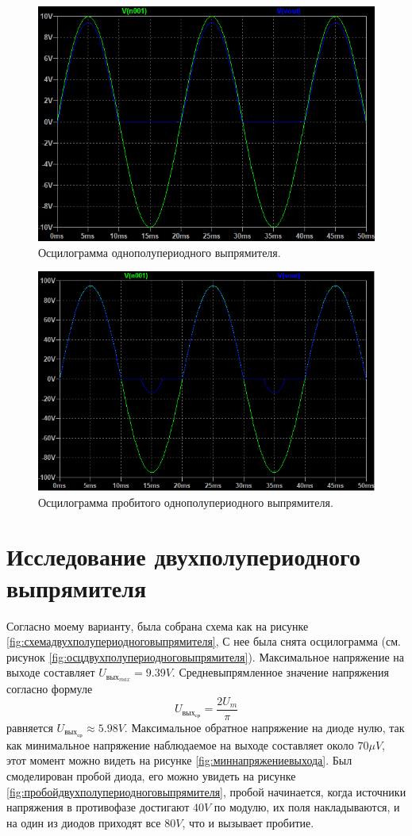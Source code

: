 \begin{figure}[htbp]
    \centering
    \includegraphics[width=0.8\linewidth]{figs/осцилограмма_выпрямителя.png}
    \caption{Осцилограмма однополупериодного выпрямителя.}
    \label{fig:осцилограмма}
\end{figure}

\begin{figure}[htbp]
    \centering
    \includegraphics[width=0.8\linewidth]{figs/осцилограмма_пробитого_выпрямителя.png}
    \caption{Осцилограмма пробитого однополупериодного выпрямителя.}
    \label{fig:осцилограммапробитая}
\end{figure}


\section*{Исследование двухполупериодного выпрямителя}

Согласно моему варианту, была собрана схема как на рисунке \ref{fig:схемадвухполупериодноговыпрямителя},
С нее была снята осцилограмма (см. рисунок \ref{fig:осцдвухполупериодноговыпрямителя}).
Максимальное напряжение на выходе составляет $U_{\text{вых}_{max}}=9.39V$. Средневыпрямленное
значение напряжения согласно формуле
$$
U_{\text{вых}_{\text{ср}}}=\frac{2U_m}{\pi}
$$
равняется $U_{\text{вых}_{\text{ср}}}\approx 5.98V$. Максимальное обратное напряжение на диоде
нулю, так как минимальное напряжение наблюдаемое на выходе составляет около $70\mu V$, этот момент
можно видеть на рисунке \ref{fig:миннапряжениевыхода}. Был смоделирован пробой диода, его
можно увидеть на рисунке \ref{fig:пробойдвухполупериодноговыпрямителя}, пробой начинается, когда
источники напряжения в противофазе достигают $40V$ по модулю, их поля накладываются, и на один из
диодов приходят все $80V$, что и вызывает пробитие.

